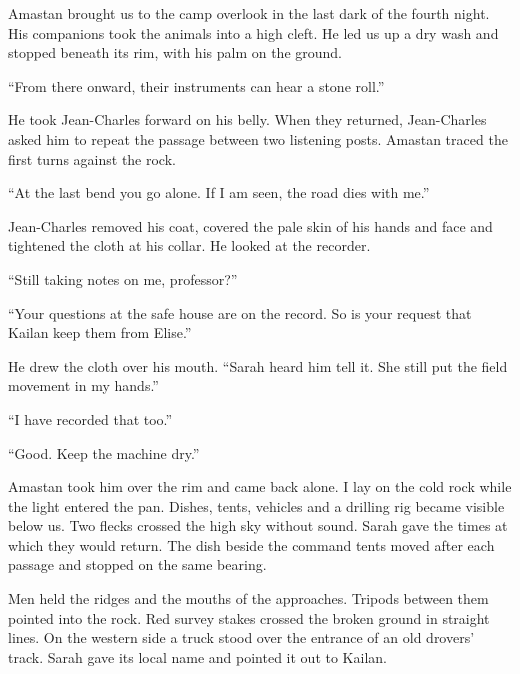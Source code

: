 \ornament

Amastan brought us to the camp overlook in the last dark of the fourth night. His companions took the animals into a high cleft. He led us up a dry wash and stopped beneath its rim, with his palm on the ground.\par

``From there onward, their instruments can hear a stone roll.''\par

He took Jean-Charles forward on his belly. When they returned, Jean-Charles asked him to repeat the passage between two listening posts. Amastan traced the first turns against the rock.\par

``At the last bend you go alone. If I am seen, the road dies with me.''\par

Jean-Charles removed his coat, covered the pale skin of his hands and face and tightened the cloth at his collar. He looked at the recorder.\par

``Still taking notes on me, professor?''\par

``Your questions at the safe house are on the record. So is your request that Kailan keep them from Elise.''\par

He drew the cloth over his mouth. ``Sarah heard him tell it. She still put the field movement in my hands.''\par

``I have recorded that too.''\par

``Good. Keep the machine dry.''\par

Amastan took him over the rim and came back alone. I lay on the cold rock while the light entered the pan. Dishes, tents, vehicles and a drilling rig became visible below us. Two flecks crossed the high sky without sound. Sarah gave the times at which they would return. The dish beside the command tents moved after each passage and stopped on the same bearing.\par

Men held the ridges and the mouths of the approaches. Tripods between them pointed into the rock. Red survey stakes crossed the broken ground in straight lines. On the western side a truck stood over the entrance of an old drovers' track. Sarah gave its local name and pointed it out to Kailan.\par

